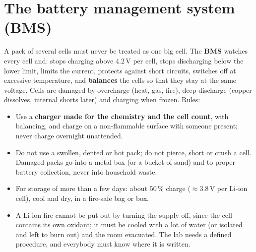 \section*{The battery management system (BMS)}
A pack of several cells must never be treated as one big cell. The \textbf{BMS} watches every cell and: stops charging above $4.2$\,V per cell, stops discharging below the lower limit, limits the current, protects against short circuits, switches off at excessive temperature, and \textbf{balances} the cells so that they stay at the same voltage. Cells are damaged by overcharge (heat, gas, fire), deep discharge (copper dissolves, internal shorts later) and charging when frozen. Rules:
\begin{itemize}[nosep]
\item Use a \textbf{charger made for the chemistry and the cell count}, with balancing, and charge on a non-flammable surface with someone present; never charge overnight unattended.
\item Do not use a swollen, dented or hot pack; do not pierce, short or crush a cell. Damaged packs go into a metal box (or a bucket of sand) and to proper battery collection, never into household waste.
\item For storage of more than a few days: about $50$\,\% charge ($\approx3.8$\,V per Li-ion cell), cool and dry, in a fire-safe bag or box.
\item A Li-ion fire cannot be put out by turning the supply off, since the cell contains its own oxidant; it must be cooled with a lot of water (or isolated and left to burn out) and the room evacuated. The lab needs a defined procedure, and everybody must know where it is written.
\end{itemize}

